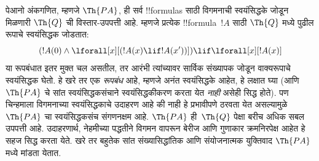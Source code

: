 \documentclass[../../../include/open-logic-section]{subfiles}
\begin{document}


पेआनो अंकगणित, म्हणजे $\Th{PA}$, ही
सर्व !!{formula}s साठी विगमनाची स्वयंसिद्धके
जोडून मिळणारी $\Th{Q}$ ची विस्तार-उपपत्ती
आहे. म्हणजे प्रत्येक !!{formula}~$!A$
साठी $\Th{Q}$ मध्ये पुढील रूपाचे
स्वयंसिद्धक जोडतात:
\[
(!A(0) \land \lforall[x][(!A(x) \lif !A(x'))]) \lif \lforall[x][!A(x)]
\]
या रूपबंधात इतर मुक्त चल असतील, तर आरंभी त्यांच्यावर
सार्विक संख्यापक जोडून वाक्यरूपाचे स्वयंसिद्धक घेतो.
हे खरे तर एक \emph{रूपबंध} आहे, म्हणजे
अनंत स्वयंसिद्धके आहेत, हे लक्षात घ्या
(आणि $\Th{PA}$ चे सांत
स्वयंसिद्धकसंचाने स्वयंसिद्धकीकरण करता येत
{\em नाही} असेही सिद्ध होते).
पण चिन्हमाला विगमनाच्या
स्वयंसिद्धकाचे उदाहरण आहे
की नाही हे प्रभावीपणे ठरवता
येत असल्यामुळे $\Th{PA}$
चा स्वयंसिद्धकसंच संगणनक्षम
आहे. $\Th{PA}$ ही~$\Th{Q}$
पेक्षा बरीच अधिक सबल
उपपत्ती आहे. उदाहरणार्थ,
नेहमीच्या पद्धतीने विगमन
वापरून बेरीज आणि गुणाकार
क्रमनिरपेक्ष आहेत हे
सहज सिद्ध करता येते.
खरे तर बहुतेक सांत
संख्यासिद्धांतिक आणि
संयोजनात्मक युक्तिवाद
$\Th{PA}$ मध्ये मांडता येतात.
\end{document}
